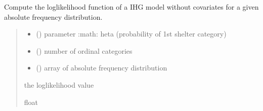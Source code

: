 \documentclass[letterpaper,10pt,english]{sphinxmanual}
\begin{document}
\begin{fulllineitems}
\label{\detokenize{cubmods:cubmods.ihg.loglik}}
\pysigstartsignatures
{}
\pysigstopsignatures
\sphinxAtStartPar
Compute the log\sphinxhyphen{}likelihood function of a IHG model without 
covariates for a given absolute frequency distribution.
\begin{quote}\begin{description}
\begin{itemize}
\item {} 
\sphinxAtStartPar
{} () \textendash{} parameter :math:\textasciigrave{}     heta\textasciigrave{} (probability of 1st shelter category)

\item {} 
\sphinxAtStartPar
{} () \textendash{} number of ordinal categories

\item {} 
\sphinxAtStartPar
{} () \textendash{} array of absolute frequency distribution

\end{itemize}

\sphinxAtStartPar
the log\sphinxhyphen{}likelihood value

\sphinxAtStartPar
float

\end{description}\end{quote}

\end{fulllineitems}

\end{document}
